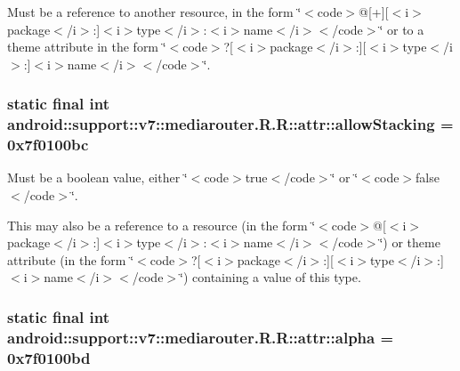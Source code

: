 Must be a reference to another resource, in the form \char`\"{}$<$code$>$@\mbox{[}+\mbox{]}\mbox{[}$<$i$>$package$<$/i$>$:\mbox{]}$<$i$>$type$<$/i$>$:$<$i$>$name$<$/i$>$$<$/code$>$\char`\"{} or to a theme attribute in the form \char`\"{}$<$code$>$?\mbox{[}$<$i$>$package$<$/i$>$:\mbox{]}\mbox{[}$<$i$>$type$<$/i$>$:\mbox{]}$<$i$>$name$<$/i$>$$<$/code$>$\char`\"{}. \hypertarget{classandroid_1_1support_1_1v7_1_1mediarouter_1_1_r_1_1attr_3a8c418a8307a820d873bf93e2bfe067}{
\subsubsection[{allowStacking}]{\setlength{\rightskip}{0pt plus 5cm}static final int android::support::v7::mediarouter.R.R::attr::allowStacking = 0x7f0100bc}}
\label{classandroid_1_1support_1_1v7_1_1mediarouter_1_1_r_1_1attr_3a8c418a8307a820d873bf93e2bfe067}


Must be a boolean value, either \char`\"{}$<$code$>$true$<$/code$>$\char`\"{} or \char`\"{}$<$code$>$false$<$/code$>$\char`\"{}. 

This may also be a reference to a resource (in the form \char`\"{}$<$code$>$@\mbox{[}$<$i$>$package$<$/i$>$:\mbox{]}$<$i$>$type$<$/i$>$:$<$i$>$name$<$/i$>$$<$/code$>$\char`\"{}) or theme attribute (in the form \char`\"{}$<$code$>$?\mbox{[}$<$i$>$package$<$/i$>$:\mbox{]}\mbox{[}$<$i$>$type$<$/i$>$:\mbox{]}$<$i$>$name$<$/i$>$$<$/code$>$\char`\"{}) containing a value of this type. \hypertarget{classandroid_1_1support_1_1v7_1_1mediarouter_1_1_r_1_1attr_29f1809de755ef7293481f09d1f24296}{
\subsubsection[{alpha}]{\setlength{\rightskip}{0pt plus 5cm}static final int android::support::v7::mediarouter.R.R::attr::alpha = 0x7f0100bd}}
\label{classandroid_1_1support_1_1v7_1_1mediarouter_1_1_r_1_1attr_29f1809de755ef7293481f09d1f24296}


